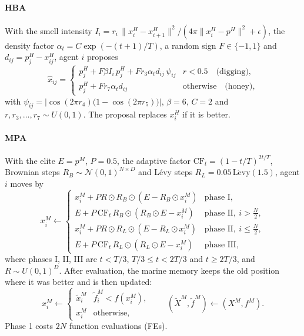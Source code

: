 \documentclass[preprint,12pt,authoryear]{elsarticle}
\theoremstyle{remark}
\begin{document}
\paragraph{HBA} With the smell intensity $I_i = r_i\,\|x^H_i - x^H_{i+1}\|^2 / (4\pi\|x^H_i - p^H\|^2 + \epsilon)$,
the density factor $\alpha_t = C\exp(-(t+1)/T)$, a random sign $F\in\{-1,1\}$ and $d_{ij}=p^H_j-x^H_{ij}$, agent $i$
proposes
\begin{equation}
\hat x_{ij} = \begin{cases}
p^H_j + F\beta I_i\,p^H_j + F r_3\alpha_t d_{ij}\,\psi_{ij} & r<0.5 \quad\text{(digging)},\\
p^H_j + F r_7\alpha_t d_{ij} & \text{otherwise} \quad\text{(honey)},
\end{cases}
\label{eq:hba}
\end{equation}
with $\psi_{ij}=\bigl|\cos(2\pi r_4)\bigl(1-\cos(2\pi r_5)\bigr)\bigr|$, $\beta=6$, $C=2$ and $r,r_3,\dots,r_7\sim U(0,1)$.
The proposal replaces $x^H_i$ if it is better.

\paragraph{MPA} With the elite $E=p^M$, $P=0.5$, the adaptive factor $\mathrm{CF}_t=(1-t/T)^{2t/T}$, Brownian steps
$R_B\sim\mathcal N(0,1)^{N\times D}$ and L\'evy steps $R_L = 0.05\,\mathrm{L\acute evy}(1.5)$, agent $i$ moves by
\begin{equation}
x^M_i \leftarrow \begin{cases}
x^M_i + P R\odot R_B\odot(E - R_B\odot x^M_i) & \text{phase I},\\
E + P\,\mathrm{CF}_t\,R_B\odot(R_B\odot E - x^M_i) & \text{phase II},\ i>\tfrac N2,\\
x^M_i + P R\odot R_L\odot(E - R_L\odot x^M_i) & \text{phase II},\ i\le\tfrac N2,\\
E + P\,\mathrm{CF}_t\,R_L\odot(R_L\odot E - x^M_i) & \text{phase III},
\end{cases}
\label{eq:mpa}
\end{equation}
where phases I, II, III are $t<T/3$, $T/3\le t<2T/3$ and $t\ge 2T/3$, and $R\sim U(0,1)^D$. After evaluation, the
marine memory keeps the old position where it was better and is then updated:
\begin{equation}
x^M_i \leftarrow \begin{cases}\tilde x^M_i & \tilde f^M_i < f(x^M_i),\\ x^M_i & \text{otherwise},\end{cases}
\qquad (\tilde X^M,\tilde f^M)\leftarrow (X^M, f^M).
\label{eq:memory}
\end{equation}
Phase 1 costs $2N$ function evaluations (FEs).
\end{document}
